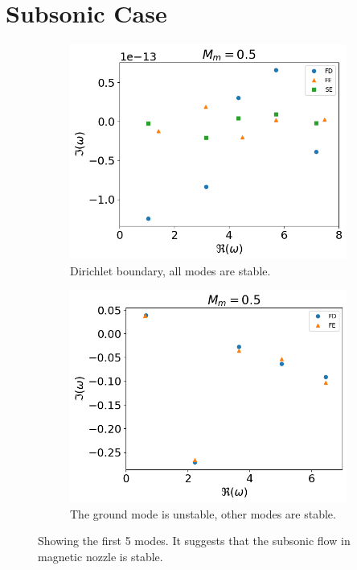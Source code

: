 \section{Subsonic Case}
\begin{figure} [H]
  \centering
  \begin{subfigure}{0.45\textwidth}
    \centering
    \includegraphics[width=\linewidth]{../../thesis/img/numerical-experiments/fixed-fixed/subsonic-v}
    \caption{Dirichlet boundary, all modes are stable.}
  \end{subfigure}%
  \begin{subfigure}{0.45\textwidth}
    \includegraphics[width=\linewidth]{../../thesis/img/numerical-experiments/fixed-open/subsonic-v}
    \caption{The ground mode is unstable, other modes are stable.}
  \end{subfigure}
  \caption{Showing the first 5 modes. It suggests that the subsonic flow in magnetic nozzle is stable.}
\end{figure}

